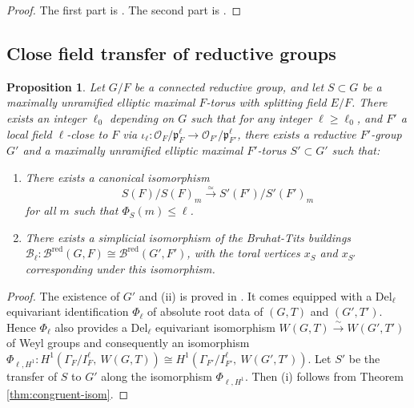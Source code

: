 \documentclass[american]{article}
\numberwithin{equation}{section}
\numberwithin{figure}{section}
\theoremstyle{plain}
\newtheorem{proposition}[theorem]{Proposition}
\theoremstyle{definition}
\theoremstyle{remark}
\newcommand{\Del}{\mathrm{Del}}
\begin{document}
\begin{proof}
The first part is \cite[Lemma 3.4.3]{KalethaRegSC}. The second part is \cite[Lemma~3.4.4(2)]{KalethaRegSC}.
\end{proof}

\subsection{Close field transfer of reductive groups}
\label{sub:vertex}

\begin{proposition}\label{prop:vertex-transfer} 
Let $G/F$ be a connected reductive group, and let $S \subset G$ be a maximally unramified elliptic maximal $F$-torus with splitting field $E/F$. There exists an integer \( \ell_0 \) depending on \( G\) such that for any integer \(\ell \geq \ell_0 \), and $F'$ a local field $\ell$-close to $F$ via $\iota_\ell: \mathscr{O}_F/\mathfrak{p}_F^\ell \to \mathscr{O}_{F'}/\mathfrak{p}_{F'}^\ell$,  there exists a reductive $F'$-group $G'$ and a maximally unramified elliptic maximal $F'$-torus $S' \subset G'$ such that:
\begin{enumerate}
    \item There exists a canonical isomorphism
    \[
    S(F)/S(F)_m \xrightarrow{\simeq} S'(F')/S'(F')_m
    \]
    for all $m$ such that $\Phi_S(m)\leq \ell$.
    \item There exists a simplicial isomorphism of the Bruhat-Tits buildings $\mathcal{B}_{\ell}:\mathcal{B}^{\mathrm{red}}(G,F)\cong \mathcal{B}^{\mathrm{red}}(G', F')$, with the toral vertices $x_S$ and $x_{S'}$ corresponding under this isomorphism.
\end{enumerate}
\end{proposition}

\begin{proof}
The existence of $G'$ and (ii) is proved in \cite[\S 1C2 and \S 1C3]{ganapathy2022}. It comes equipped with a \(\Del_\ell\) equivariant identification $\Phi_\ell$ of absolute root data of $(G,T)$ and $(G',T')$. Hence $\Phi_\ell$ also provides a \(\Del_\ell\) equivariant isomorphism $W(G,T)\xrightarrow{\sim}W(G',T')$ of Weyl groups and consequently an isomorphism \(\Phi_{\ell,H^1}:H^1(\Gamma_{F}/I_{F}^\ell,\ W(G,T))\cong H^1(\Gamma_{F'}/I_{F'}^\ell,\ W(G',T'))\). Let $S'$ be the transfer of $S$ to $G'$ along the isomorphism $\Phi_{\ell,H^1}$. 
Then (i) follows from Theorem \ref{thm:congruent-isom}. 
\end{proof}
\end{document}
